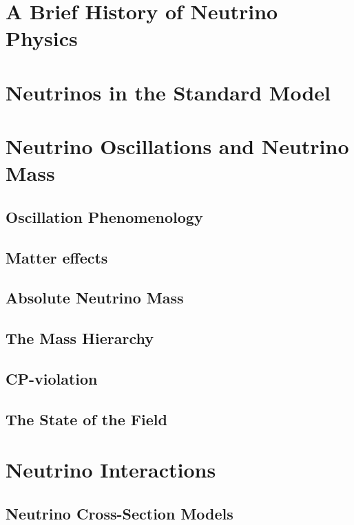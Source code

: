 \section{A Brief History of Neutrino Physics}

\section{Neutrinos in the Standard Model}
\section{Neutrino Oscillations and Neutrino Mass}
\subsection{Oscillation Phenomenology}
\subsection{Matter effects}
\subsection{Absolute Neutrino Mass}
\subsection{The Mass Hierarchy}
\subsection{CP-violation}
\subsection{The State of the Field}

\section{Neutrino Interactions}
\subsection{Neutrino Cross-Section Models}